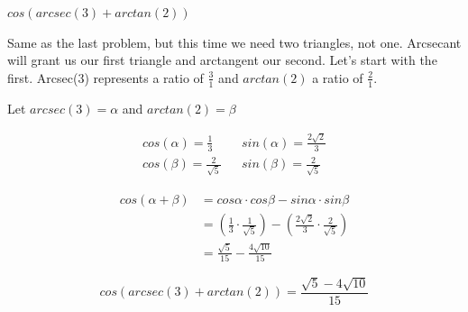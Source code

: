 \documentclass[10pt,letterpaper]{amspset}
\begin{document}
\pagebreak


\begin{problem}[156]
    $cos(arcsec(3) + arctan(2))$
\end{problem}

\begin{solution}
    Same as the last problem, but this time we need two triangles, not one. Arcsecant will grant us our first triangle and arctangent our second. Let's start with the first. Arcsec(3) represents a ratio of $\frac{3}{1}$ and $arctan(2)$ a ratio of $\frac{2}{1}$. \medskip
    
    Let $arcsec(3) = \alpha$ and $arctan(2) = \beta$
    \medskip
    

    \begin{align}
        cos \left( \alpha \right) = \frac{1}{3} && sin \left( \alpha \right) = \frac{2\sqrt{2}}{3} \\
        cos\left( \beta \right) = \frac{2}{\sqrt{5}} && sin \left( \beta \right) = \frac{2}{\sqrt{5}}
    \end{align}
    
    \begin{align}
        cos(\alpha + \beta) &= cos\alpha \cdot cos\beta - sin\alpha \cdot sin\beta \\
        &= \left( \frac{1}{3} \cdot \frac{1}{\sqrt{5}} \right) - \left( \frac{2\sqrt{2}}{3} \cdot \frac{2}{\sqrt{5}}\right)\\
        &= \frac{\sqrt{5}}{15} - \frac{4\sqrt{10}}{15}
    \end{align}
    
    \[\boxed{ cos(arcsec(3) + arctan(2)) = \frac{ \sqrt{5} - 4\sqrt{10} }{ 15 }  }\]
\end{solution}
\end{document}
